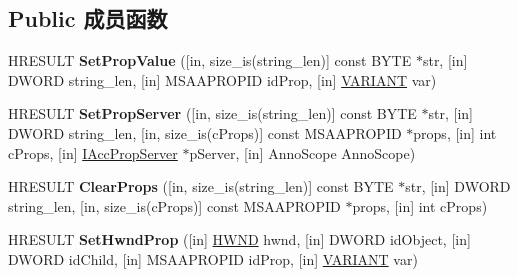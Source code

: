 \subsection*{Public 成员函数}
\begin{DoxyCompactItemize}
\item 
\mbox{\label{interface_i_acc_prop_services_a2d9f9f7b93639d64bbf2219dd21dae88}} 
H\+R\+E\+S\+U\+LT {\bfseries Set\+Prop\+Value} (\mbox{[}in, size\+\_\+is(string\+\_\+len)\mbox{]} const B\+Y\+TE $\ast$str, \mbox{[}in\mbox{]} D\+W\+O\+RD string\+\_\+len, \mbox{[}in\mbox{]} M\+S\+A\+A\+P\+R\+O\+P\+ID id\+Prop, \mbox{[}in\mbox{]} \hyperlink{structtag_v_a_r_i_a_n_t}{V\+A\+R\+I\+A\+NT} var)
\item 
\mbox{\label{interface_i_acc_prop_services_a316d85a5079f3ef8e37da8f69a39590b}} 
H\+R\+E\+S\+U\+LT {\bfseries Set\+Prop\+Server} (\mbox{[}in, size\+\_\+is(string\+\_\+len)\mbox{]} const B\+Y\+TE $\ast$str, \mbox{[}in\mbox{]} D\+W\+O\+RD string\+\_\+len, \mbox{[}in, size\+\_\+is(c\+Props)\mbox{]} const M\+S\+A\+A\+P\+R\+O\+P\+ID $\ast$props, \mbox{[}in\mbox{]} int c\+Props, \mbox{[}in\mbox{]} \hyperlink{interface_i_acc_prop_server}{I\+Acc\+Prop\+Server} $\ast$p\+Server, \mbox{[}in\mbox{]} Anno\+Scope Anno\+Scope)
\item 
\mbox{\label{interface_i_acc_prop_services_a72a76950f954d8d979288097c911dbba}} 
H\+R\+E\+S\+U\+LT {\bfseries Clear\+Props} (\mbox{[}in, size\+\_\+is(string\+\_\+len)\mbox{]} const B\+Y\+TE $\ast$str, \mbox{[}in\mbox{]} D\+W\+O\+RD string\+\_\+len, \mbox{[}in, size\+\_\+is(c\+Props)\mbox{]} const M\+S\+A\+A\+P\+R\+O\+P\+ID $\ast$props, \mbox{[}in\mbox{]} int c\+Props)
\item 
\mbox{\label{interface_i_acc_prop_services_a2ebb6b5292c2d8d3da627289d8f8d7b9}} 
H\+R\+E\+S\+U\+LT {\bfseries Set\+Hwnd\+Prop} (\mbox{[}in\mbox{]} \hyperlink{interfacevoid}{H\+W\+ND} hwnd, \mbox{[}in\mbox{]} D\+W\+O\+RD id\+Object, \mbox{[}in\mbox{]} D\+W\+O\+RD id\+Child, \mbox{[}in\mbox{]} M\+S\+A\+A\+P\+R\+O\+P\+ID id\+Prop, \mbox{[}in\mbox{]} \hyperlink{structtag_v_a_r_i_a_n_t}{V\+A\+R\+I\+A\+NT} var)
\item 
\mbox{\label{interface_i_acc_prop_services_a1eb89a68b0da8ab7c33bc2ad582a4730}} 

\end{DoxyCompactItemize}
